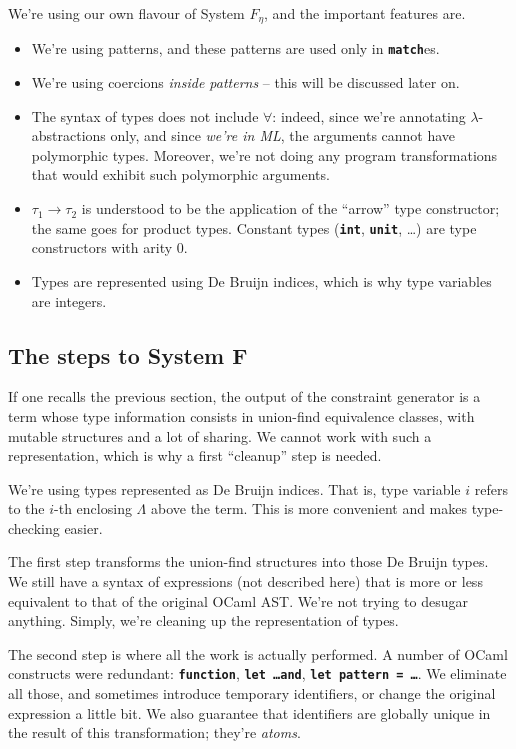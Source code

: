 \documentclass[10pt,a4paper,twoside,titlepage,twocolumn]{article}
\newcommand{\code}[1]{\textbf{\texttt{#1}}}
\begin{document}
We're using our own flavour of System $F_\eta$, and
the important features are.
\begin{itemize}
  \item We're using patterns, and these patterns are used only in
    \code{match}es.
  \item We're using coercions \emph{inside patterns} -- this will be discussed
    later on.
  \item The syntax of types does not include $\forall$: indeed, since we're
    annotating $\lambda$-abstractions only, and since \emph{we're in ML}, the
    arguments cannot have polymorphic types. Moreover, we're not doing any
    program transformations that would exhibit such polymorphic arguments.
  \item $\tau_1 \to \tau_2$ is understood to be the application of the ``arrow''
    type constructor; the same goes for product types. Constant types
    (\code{int}, \code{unit}, …) are type constructors with arity 0.
  \item Types are represented using De Bruijn indices, which is why type
    variables are integers.
\end{itemize}

\subsection{The steps to System F}

If one recalls the previous section, the output of the constraint generator is a
term whose type information consists in union-find equivalence classes, with
mutable structures and a lot of sharing. We cannot work with such a
representation, which is why a first ``cleanup'' step is needed.

We're using types represented as De Bruijn indices. That is, type variable
$i$ refers to the $i$-th enclosing $\Lambda$ above the term. This is more
convenient and makes type-checking easier.

The first step transforms the union-find structures into those De Bruijn types.
We still have a syntax of expressions (not described here) that is more or less
equivalent to that of the original OCaml AST. We're not trying to desugar
anything. Simply, we're cleaning up the representation of types.

The second step is where all the work is actually performed. A number of OCaml
constructs were redundant: \code{function}, \code{let \dots\;and}, \code{let
pattern = \dots}. We eliminate all those, and sometimes introduce temporary
identifiers, or change the original expression a little bit. We also guarantee
that identifiers are globally unique in the result of this transformation;
they're \emph{atoms}.
\end{document}
